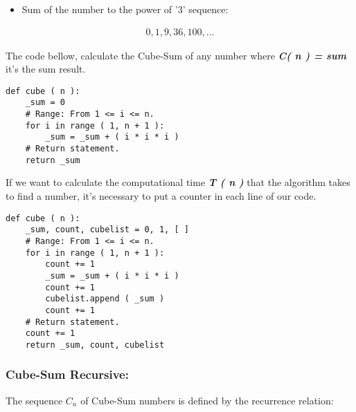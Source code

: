 \documentclass[10pt,a4paper]{article}
\begin{document}
\begin{itemize}
\item Sum of the number to the power of '3' sequence:
\end{itemize}

\begin{ceqn}
\begin{align}
0, 1, 9, 36, 100, ...
\end{align}
\end{ceqn}

The code bellow, calculate the Cube-Sum of any number where {\bfseries\itshape C( n ) = sum} it's the sum result. \hfill \break

\begin{lstlisting}
def cube ( n ):
    _sum = 0
    # Range: From 1 <= i <= n.
    for i in range ( 1, n + 1 ):
        _sum = _sum + ( i * i * i )
    # Return statement.
    return _sum
\end{lstlisting} \hfill

If we want to calculate the computational time {\bfseries\itshape T ( n )} that the algorithm takes to find a number, it's necessary to put a counter in each line of our code. \hfill \break

\begin{lstlisting}
def cube ( n ):
    _sum, count, cubelist = 0, 1, [ ]
    # Range: From 1 <= i <= n.
    for i in range ( 1, n + 1 ):
        count += 1
        _sum = _sum + ( i * i * i )
        count += 1
        cubelist.append ( _sum )
        count += 1
    # Return statement.
    count += 1
    return _sum, count, cubelist
\end{lstlisting} \hfill

{\bfseries\itshape\color{OliveGreen}{Observation:}} {\itshape\color{OliveGreen}{Now, apart of return the sum result, the code will also return the counter and a list of all the previous numbers of the sequence after 'n'.}} \hfill \break

{\bfseries\itshape\color{OliveGreen}{Observation:}} {\itshape{}}

\pagebreak

\subsubsection{Cube-Sum Recursive:}

The sequence $C_{n}$ of Cube-Sum numbers is defined by the recurrence relation:
\end{document}
